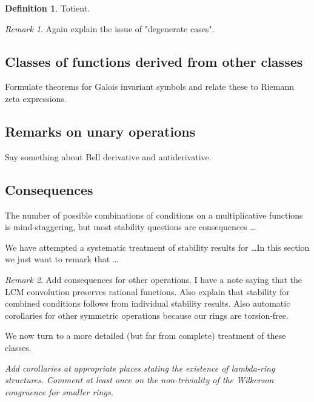 \documentclass[a4paper]{article}
\theoremstyle{definition}
\newtheorem{definition}{Definition}[section]
\theoremstyle{remark}
\newtheorem*{remark}{Remark}
\begin{document}
\begin{definition}
Totient.
\end{definition}

\begin{remark}
Again explain the issue of "degenerate cases".
\end{remark}


\subsection{Classes of functions derived from other classes}

Formulate theorems for Galois invariant symbols and relate these to Riemann zeta expressions.



\subsection{Remarks on unary operations}

Say something about Bell derivative and antiderivative.



\subsection{Consequences}

The number of possible combinations of conditions on a multiplicative functions is mind-staggering, but most stability questions are consequences \ldots

We have attempted a systematic treatment of stability results for \ldots In this section we just want to remark that \ldots

\begin{remark}
Add consequences for other operations. I have a note saying that the LCM convolution preserves rational functions. Also explain that stability for combined conditions follows from individual stability results. Also automatic corollaries for other symmetric operations because our rings are torsion-free.
\end{remark}

We now turn to a more detailed (but far from complete) treatment of these classes. 

\emph{Add corollaries at appropriate places stating the existence of lambda-ring structures. Comment at least once on the non-triviality of the Wilkerson congruence for smaller rings.}
\end{document}
